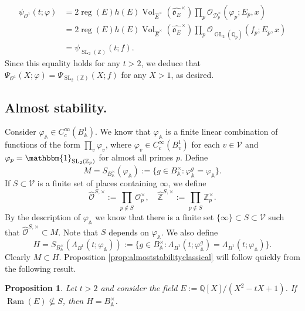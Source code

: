 \documentclass{article}
\newtheorem{prop}[lem]{Proposition}
\theoremstyle{named}
\newcommand{\D}{\mathcal{D}}
\newcommand{\Z}{\mathbb{Z}}
\newcommand{\A}{\mathbb{A}}
\newcommand{\Q}{\mathbb{Q}}
\renewcommand{\O}{\mathcal{O}}
\renewcommand{\o}{\mathfrak{o}}
\newcommand{\Pl}{\mathcal{V}}
\DeclareMathOperator{\SL}{SL}
\DeclareMathOperator{\GL}{GL}
\DeclareMathOperator{\vol}{Vol}
\DeclareMathOperator{\reg}{reg}
\DeclareMathOperator{\Ram}{Ram}
\begin{document}
\begin{equation*}
\begin{aligned}
\psi_{\O^1}(t; \varphi) & = 2 \reg(E) h(E) \vol_{\widehat{E}^\times}(\widehat{\o_{E}}^\times)\prod_p \O_{\D_p^\times}(\varphi_p; E_p, x)\\
&  = 2 \reg(E) h(E) \vol_{\widehat{E}^\times}(\widehat{\o_{E}}^\times)\prod_p \O_{\GL_2(\Q_p)}(f_p; E_p, x) \\
& = \psi_{\SL_2(\Z)}(t; f).
\end{aligned}
\end{equation*}
Since this equality holds for any $t > 2$, we deduce that $\Psi_{\O^1}(X; \varphi) = \Psi_{\SL_2(\Z)}(X; f)$ for any $X > 1$, as desired.  

\subsection{Almost stability.}\label{subsec:almoststability}
Consider $\varphi_\A \in C_c^\infty(B_\A^1)$. We know that $\varphi_\A$ is a finite linear combination of functions of the form $\prod_v \varphi_v$, where $\varphi_v \in C_c^\infty(B_v^1)$ for each $v \in \Pl$ and $\varphi_p = \mathbbm{1}_{\SL_2(\Z_p)}$ for almost all primes $p$. Define 
\begin{equation*}
    M = S_{B_\A^\times}(\varphi_\A) := \{g \in B_\A^\times : \varphi_\A^g = \varphi_\A\}.
\end{equation*}
If $S \subset \Pl$ is a finite set of places containing $\infty$, we define 
\begin{equation*}
\widehat{\O}^{S, \times} := \prod_{p \notin S} \O_p^\times, \quad \widehat{\Z}^{S, \times} := \prod_{p \notin S} \Z_p^\times.
\end{equation*}
By the description of $\varphi_\A$ we know that there is a finite set $\{\infty\}\subset S \subset \Pl$ such that $\widehat{\O}^{S, \times} \subset M$. Note that $S$ depends on $\varphi_\A$. We also define
\begin{equation}\label{eq:stabilizerorbitalintegral}
    H = S_{B_\A^\times}(\Lambda_{B^1}(t; \varphi_\A)) :=  \{g \in B_\A^\times : \Lambda_{B^1}(t; \varphi_\A^g) = \Lambda_{B^1}(t; \varphi_\A)\}.
\end{equation}
Clearly $M \subset  H$. Proposition \ref{prop:almoststabilityclassical} will follow quickly from the following result. 

\begin{prop}\label{prop:stability}
Let $t > 2$ and consider the field $E := \Q[X]/(X^2 - tX + 1)$. If $\Ram(E) \nsubseteq S$, then $H = B_\A^\times$.
\end{prop}
\end{document}
